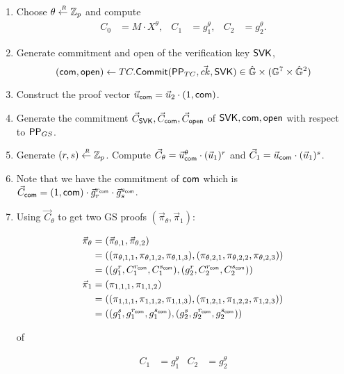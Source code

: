 \begin{description}
\begin{enumerate}
  \item Choose $\theta \stackrel{{\scriptscriptstyle \mkern4mu R}}{\gets} \mathbb{Z}_p$ and compute
    \begin{align*}
      C_0 &= M\cdot X^{\theta}, & C_1 &= g_1^{\theta}, & C_2 &= g_2^{\theta}.
    \end{align*}
  \item Generate commitment and open of the verification key $\mathsf{SVK}$, 
    $$(\mathsf{com}, \mathsf{open}) \gets TC.{\mathsf{Commit}}(\mathsf{PP}_{TC}, \vec{ck}, \mathsf{SVK}) \in \hat{\mathbb{G}} \times (\mathbb{G}^7 \times \hat{\mathbb{G}}^2)$$
  \item Construct the proof vector $\vec{u}_{\mathsf{com}} = \vec{u}_2\cdot (1, \mathsf{com})$.
  \item Generate the commitment $\vec{C}_{\mathsf{SVK}}, \vec{C}_{\mathsf{com}}, \vec{C}_{\mathsf{open}}$ of $\mathsf{SVK}, \mathsf{com}, \mathsf{open}$ with respect to $\mathsf{PP}_{GS}$.
  \item Generate $(r,s) \stackrel{{\scriptscriptstyle \mkern4mu R}}{\gets} \mathbb{Z}_p$. Compute $\vec{C}_{\theta} = \vec{u}_{\mathsf{com}}^{\theta} \cdot (\vec{u}_1)^r$ and $\vec{C}_{1} = \vec{u}_{\mathsf{com}} \cdot (\vec{u}_1)^s$.
  \item Note that we have the commitment of $\mathsf{com}$ which is $\vec{C}_{\mathsf{com}} = (1, \mathsf{com}) \cdot \vec{g}_r^{r_{\mathsf{com}}} \cdot \vec{g}_s^{s_{\mathsf{com}}}$.
  \item Using $\vec{C}_{\theta}$ to get two GS proofs $(\vec{\pi}_{\theta}, \vec{\pi}_1)$:

    \begin{align*}
      \vec{\pi}_{\theta} &= (\vec{\pi}_{\theta,1}, \vec{\pi}_{\theta,2})\\
      &= ((\pi_{\theta,1,1}, \pi_{\theta,1,2}, \pi_{\theta,1,3}), (\pi_{\theta,2,1}, \pi_{\theta,2,2}, \pi_{\theta,2,3}))\\
      &= ((g_1^r, C_1^{r_{\mathsf{com}}}, C_1^{s_{\mathsf{com}}}),(g_2^r, C_2^{r_{\mathsf{com}}}, C_2^{s_{\mathsf{com}}}))\\     
      \vec{\pi}_{1} &= (\pi_{1,1,1}, \pi_{1,1,2})\\
      &= ((\pi_{1,1,1}, \pi_{1,1,2}, \pi_{1,1,3}), (\pi_{1,2,1}, \pi_{1,2,2}, \pi_{1,2,3}))\\
      &= ((g_1^s, g_1^{r_{\mathsf{com}}}, g_1^{s_{\mathsf{com}}}),(g_2^s, g_2^{r_{\mathsf{com}}}, g_2^{s_{\mathsf{com}}}))
    \end{align*}

    of
    
    \begin{align*}
      C_1 &= g_1^{\theta} & C_2 &= g_2^{\theta}
    \end{align*}


\end{enumerate}
\end{description}
